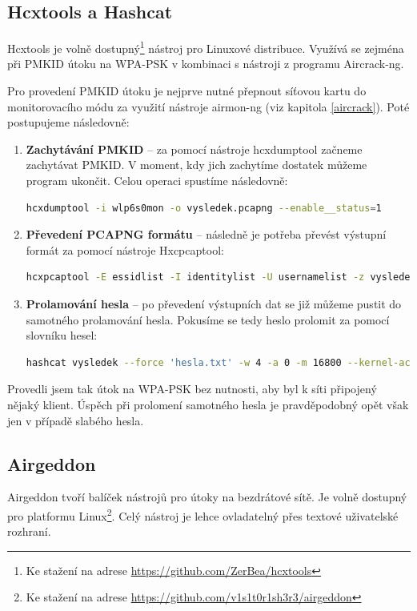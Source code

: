 \subsection{Hcxtools a Hashcat}
Hcxtools je volně dostupný\footnote{Ke stažení na adrese \url{https://github.com/ZerBea/hcxtools}} nástroj pro Linuxové distribuce. Využívá se zejména při PMKID útoku na WPA-PSK v kombinaci s nástroji z programu Aircrack-ng. 

Pro provedení PMKID útoku je nejprve nutné přepnout síťovou kartu do monitorovacího módu za využití nástroje airmon-ng (viz kapitola \ref{aircrack}). Poté postupujeme následovně:
\begin{enumerate}
  \item{\textbf{Zachytávání PMKID} -- za pomocí nástroje hcxdumptool začneme zachytávat PMKID. V moment, kdy jich zachytíme dostatek můžeme program ukončit. Celou operaci spustíme následovně:
\begin{lstlisting}[language=bash]
hcxdumptool -i wlp6s0mon -o vysledek.pcapng --enable__status=1
\end{lstlisting}
  }
  \item{\textbf{Převedení PCAPNG formátu} -- následně je potřeba převést výstupní formát za pomocí nástroje Hxcpcaptool:
\begin{lstlisting}[language=bash]
hcxpcaptool -E essidlist -I identitylist -U usernamelist -z vysledek vysledek.pcapng
\end{lstlisting}
  }
  \item{\textbf{Prolamování hesla} -- po převedení výstupních dat se již můžeme pustit do samotného prolamování hesla. Pokusíme se tedy heslo prolomit za pomocí slovníku hesel:
\begin{lstlisting}[language=bash]
hashcat vysledek --force 'hesla.txt' -w 4 -a 0 -m 16800 --kernel-accel=1
\end{lstlisting}
  }
\end{enumerate}

Provedli jsem tak útok na WPA-PSK bez nutnosti, aby byl k síti připojený nějaký klient. Úspěch při prolomení samotného hesla je pravděpodobný opět však jen v případě slabého hesla. 

\subsection{Airgeddon}
Airgeddon tvoří balíček nástrojů pro útoky na bezdrátové sítě. Je volně dostupný pro platformu Linux\footnote{Ke stažení na adrese \url{https://github.com/v1s1t0r1sh3r3/airgeddon}}. Celý nástroj je lehce ovladatelný přes textové uživatelské rozhraní. 

